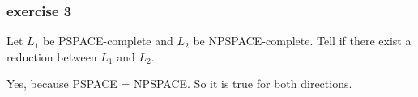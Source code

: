 \documentclass[12pt]{article}
\begin{document}
\subsubsection{exercise 3}
Let $L_1$ be \textsc{PSPACE}-complete and $L_2$ be \textsc{NPSPACE}-complete. Tell if there exist a reduction between $L_1$ and $L_2$.


Yes, because \textsc{PSPACE} = \textsc{NPSPACE}. So it is true for both directions.







\end{document}
